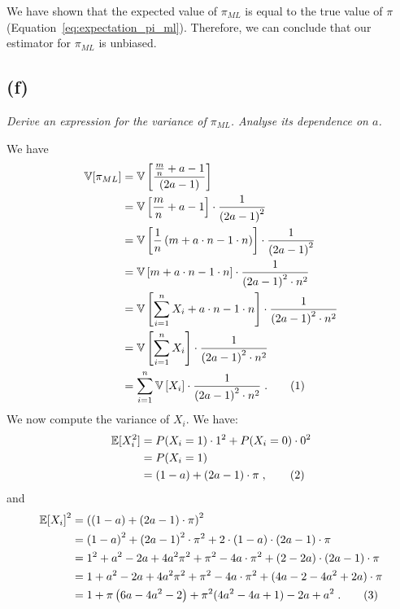 \documentclass{article}
\newcommand{\stepandtag}{%
  \refstepcounter{equation}%
  \tag{\theequation}%
}
\newcommand{\piml}{\ensuremath{\pi_{ML}}}
\begin{document}
We have shown that the expected value of $\piml$ is equal to the true value of $\pi$ (Equation~\ref{eq:expectation_pi_ml}). Therefore, we can conclude that our estimator for $\pi_{ML}$ is unbiased.

\subsection*{(f)}
\textit{Derive an expression for the variance of $\piml$. Analyse its dependence on $a$.}

We have
\begin{align*}
    \mathbb{V}[\pi_{ML}] &= \mathbb{V}\left[ \frac{\frac{m}{n} + a - 1}{(2a -1)} \right] \\
    &= \mathbb{V}\left[ \frac{m}{n} + a - 1 \right] \cdot \frac{1}{{(2a-1)}^2} \\
    &= \mathbb{V}\left[ \frac{1}{n} \left( m + a \cdot n - 1 \cdot n \right) \right] \cdot \frac{1}{{(2a-1)}^2} \\
    &= \mathbb{V}\left[  m + a \cdot n - 1 \cdot n \right] \cdot \frac{1}{{(2a-1)}^2 \cdot n^2} \\
    &= \mathbb{V}\left[  \sum_{i=1}^{n} X_i + a \cdot n - 1 \cdot n \right] \cdot \frac{1}{{(2a-1)}^2 \cdot n^2} \\
    &= \mathbb{V}\left[  \sum_{i=1}^{n} X_i \right] \cdot \frac{1}{{(2a-1)}^2 \cdot n^2} \\
    &= \sum_{i=1}^{n} \mathbb{V}\left[  X_i \right] \cdot \frac{1}{{(2a-1)}^2 \cdot n^2}\;.\stepandtag \label{eq:variance_pi_ml_1}
\end{align*}
We now compute the variance of $X_i$. We have:
\begin{align*}
    \mathbb{E}[X_i^2] &= P(X_i = 1) \cdot 1^2 + P(X_i = 0) \cdot 0 ^2 \\ 
    &= P(X_i = 1) \\
    &= (1-a) + (2a - 1) \cdot \pi\;, \stepandtag \label{eq:expectation_complex_x_i_square_inside}
\end{align*}
and
\begin{align*}
    {\mathbb{E}[X_i]}^2 &= {\left( (1-a) + (2a - 1) \cdot \pi  \right)}^2 \\
    &= {(1-a)}^2 + {(2a - 1)}^2 \cdot \pi^2 + 2 \cdot (1-a) \cdot (2a - 1) \cdot \pi \\
    &= 1^2+a^2 - 2a + 4a^2\pi^2 + \pi^2 - 4a \cdot \pi^2 + (2-2a) \cdot (2a - 1) \cdot \pi \\
    &= 1+a^2 - 2a + 4a^2\pi^2 + \pi^2 - 4a \cdot \pi^2 + (4a - 2 - 4a^2 + 2a) \cdot \pi \\
    &= 1 + \pi \left(6a - 4a^2 - 2 \right) + \pi^2 (4 a^2 - 4 a + 1) - 2a + a^2\;. \stepandtag \label{eq:expectation_complex_x_i_square_outside}
\end{align*}
\end{document}
